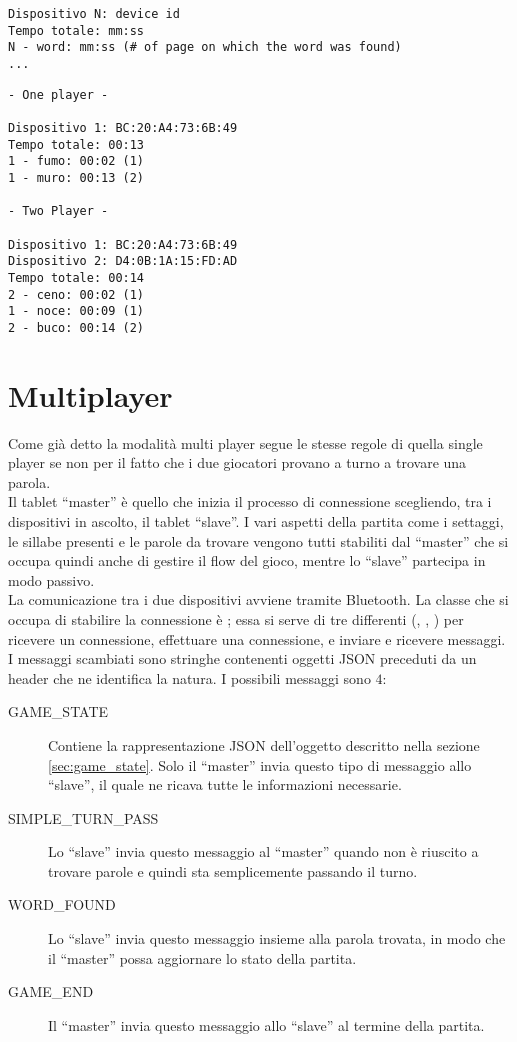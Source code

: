 \begin{lstlisting}[float, caption=Struttura delle satistiche inviate, label=lst:stats]
Dispositivo N: device id
Tempo totale: mm:ss
N - word: mm:ss (# of page on which the word was found)
...
\end{lstlisting}


\begin{lstlisting}[float, caption=Esempio di statistiche, label=lst:stats_example]
- One player -

Dispositivo 1: BC:20:A4:73:6B:49
Tempo totale: 00:13
1 - fumo: 00:02 (1)
1 - muro: 00:13 (2)

- Two Player -

Dispositivo 1: BC:20:A4:73:6B:49
Dispositivo 2: D4:0B:1A:15:FD:AD
Tempo totale: 00:14
2 - ceno: 00:02 (1)
1 - noce: 00:09 (1)
2 - buco: 00:14 (2)
\end{lstlisting}

\section{Multiplayer}
\label{sec:multiplayer}
Come già detto la modalità multi player segue le stesse regole di quella single player se non per il fatto che i due giocatori provano a turno a trovare una parola.\\
Il tablet ``master'' è quello che inizia il processo di connessione scegliendo, tra i dispositivi in ascolto, il tablet ``slave''. I vari aspetti della partita come i settaggi, le sillabe presenti e le parole da trovare vengono tutti stabiliti dal ``master'' che si occupa quindi anche di gestire il flow del gioco, mentre lo ``slave'' partecipa in modo passivo.\\
La comunicazione tra i due dispositivi avviene tramite Bluetooth. La classe che si occupa di stabilire la connessione è ; essa si serve di tre  differenti (, , ) per ricevere un connessione, effettuare una connessione, e inviare e ricevere messaggi.\\
I messaggi scambiati sono stringhe contenenti oggetti JSON preceduti da un header che ne identifica la natura. I possibili messaggi sono $4$:

\begin{description}
    \item[GAME\_STATE] Contiene la rappresentazione JSON dell'oggetto  descritto nella sezione \ref{sec:game_state}. Solo il ``master'' invia questo tipo di messaggio allo ``slave'', il quale ne ricava tutte le informazioni necessarie.
    \item[SIMPLE\_TURN\_PASS] Lo ``slave'' invia questo messaggio al ``master'' quando non è riuscito a trovare parole e quindi sta semplicemente passando il turno.
    \item[WORD\_FOUND] Lo ``slave'' invia questo messaggio insieme alla parola trovata, in modo che il ``master'' possa aggiornare lo stato della partita.
    \item[GAME\_END] Il ``master'' invia questo messaggio allo ``slave'' al termine della partita.
\end{description}